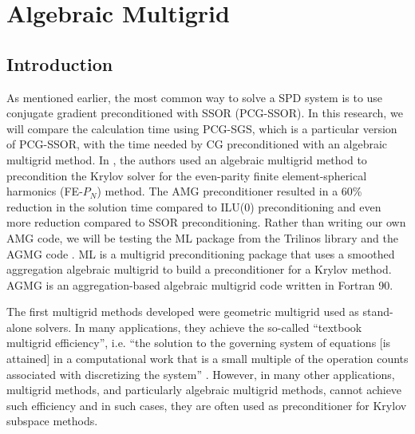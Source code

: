 \section{Algebraic Multigrid} \label{sec_amg}
\subsection{Introduction}
As mentioned earlier, the most common way to solve a SPD system is to use
conjugate gradient preconditioned with SSOR (PCG-SSOR). In this research, we
will compare the calculation time using PCG-SGS, which is a particular version
of PCG-SSOR, with the time needed by CG 
preconditioned with an algebraic multigrid method. In \cite{amg_pn}, the authors 
used an algebraic multigrid method to precondition the Krylov solver for the 
even-parity finite element-spherical harmonics (FE-$P_N$) method. The AMG 
preconditioner resulted in a 60\% reduction in the solution time compared to 
ILU(0) preconditioning and even more reduction compared to SSOR preconditioning. 
Rather than writing our own AMG code, we will be testing the ML package 
\cite{ml_guide} from the Trilinos library and the AGMG code \cite{agmg_guide}. 
ML is a multigrid preconditioning package that uses a smoothed aggregation 
algebraic multigrid to build a preconditioner for a Krylov method. AGMG is an 
aggregation-based algebraic multigrid code written in Fortran 90.

The first multigrid methods developed were geometric multigrid used as 
stand-alone solvers. In many applications, they achieve the so-called 
``textbook multigrid efficiency'', i.e. ``the solution to the governing 
system of equations [is attained] in a computational work that is a small 
multiple of the operation counts associated with discretizing the system'' 
\cite{textbook_eff}. However, in many other applications, multigrid methods, 
and particularly algebraic multigrid methods, cannot achieve such efficiency 
\cite{k_cycle} and in such cases, they are often used as preconditioner for 
Krylov subspace methods. 

